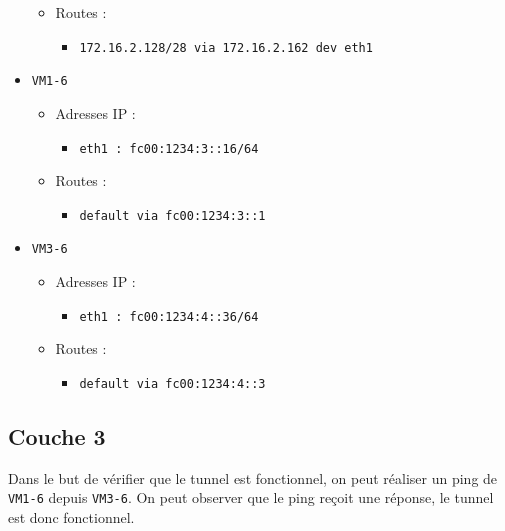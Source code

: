 \documentclass[a4paper, 10pt]{article}
\begin{document}
\begin{itemize}
\begin{itemize}
                \item Routes :
                      \begin{itemize}
                        \item \verb+172.16.2.128/28 via 172.16.2.162 dev eth1+
                      \end{itemize}
              \end{itemize}

        \item \verb+VM1-6+
              \begin{itemize}
                \item Adresses IP :
                      \begin{itemize}
                        \item \verb+eth1 : fc00:1234:3::16/64+
                      \end{itemize}

                \item Routes :
                      \begin{itemize}
                        \item \verb+default via fc00:1234:3::1+
                      \end{itemize}
              \end{itemize}

        \item \verb+VM3-6+
              \begin{itemize}
                \item Adresses IP :
                      \begin{itemize}
                        \item \verb+eth1 : fc00:1234:4::36/64+
                      \end{itemize}

                \item Routes :
                      \begin{itemize}
                        \item \verb+default via fc00:1234:4::3+
                      \end{itemize}
              \end{itemize}
      \end{itemize}

    \subsection{Couche 3}
      Dans le but de vérifier que le tunnel est fonctionnel, on peut réaliser un
      ping de \verb+VM1-6+ depuis \verb+VM3-6+. On peut observer que le ping
      reçoit une réponse, le tunnel est donc fonctionnel. \\
\end{document}
